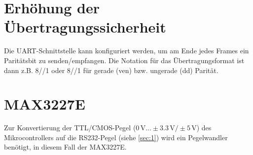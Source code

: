 \documentclass[a4paper, 11pt]{article}
\begin{document}
  \section{Erhöhung der Übertragungssicherheit}
  Die UART-Schnittstelle kann konfiguriert werden, um am Ende jedes Frames ein
  Paritätsbit zu senden/empfangen. Die Notation für das Übertragungsformat ist
  dann z.B. 8/{\color{cyan5}{E}}/1 oder 8/{\color{orange5}{O}}/1 für gerade ({\color{cyan5}{E}}ven)
  bzw. ungerade ({\color{orange5}{O}}dd) Parität.

  \section{MAX3227E}
  Zur Konvertierung der TTL/CMOS-Pegel ($0 \, \si{\volt}...\pm 3.3 \,
  \si{\volt}/ \pm 5\,\si{\volt}$) des Mikrocontrollers auf die RS232-Pegel
  (siehe \ref{sec:1}) wird ein Pegelwandler benötigt, in diesem Fall der MAX3227E.
  
\end{document}
